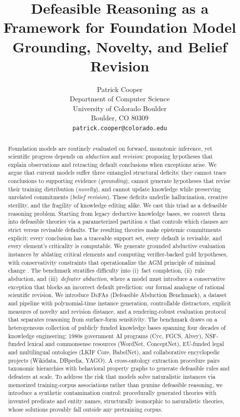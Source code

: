 \documentclass{article}
\title{Defeasible Reasoning as a Framework for Foundation Model Grounding, Novelty, and Belief Revision}
\author{%
  Patrick Cooper \\
  Department of Computer Science\\
  University of Colorado Boulder\\
  Boulder, CO 80309 \\
  \texttt{patrick.cooper@colorado.edu} \\
}
\theoremstyle{definition}
\begin{document}
\maketitle


\begin{abstract}
Foundation models are routinely evaluated on forward, monotonic inference, yet scientific progress depends on \emph{abduction} and \emph{revision}: proposing hypotheses that explain observations and retracting default conclusions when exceptions arise. We argue that current models suffer three entangled structural deficits: they cannot trace conclusions to supporting evidence (\emph{grounding}), cannot generate hypotheses that revise their training distribution (\emph{novelty}), and cannot update knowledge while preserving unrelated commitments (\emph{belief revision}). These deficits underlie hallucination, creative sterility, and the fragility of knowledge editing alike.
We cast this triad as a defeasible reasoning problem. Starting from legacy deductive knowledge bases, we convert them into defeasible theories via a parameterized partition $\kappa$ that controls which clauses are strict versus revisable defaults. The resulting theories make epistemic commitments explicit: every conclusion has a traceable support set, every default is revisable, and every element's criticality is computable. We generate grounded abductive evaluation instances by ablating critical elements and computing verifier-backed gold hypotheses, with conservativity constraints that operationalize the AGM principle of minimal change \cite{alchourron1985logic}. The benchmark stratifies difficulty into (i)~fact completion, (ii)~rule abduction, and (iii)~\emph{defeater abduction}, where a model must introduce a conservative exception that blocks an incorrect default prediction: our formal analogue of rational scientific revision.
We introduce \textsc{DeFAb} (Defeasible Abduction Benchmark), a dataset and pipeline with polynomial-time instance generation, controllable distractors, explicit measures of novelty and revision distance, and a rendering-robust evaluation protocol that separates reasoning from surface-form sensitivity. The benchmark draws on a heterogeneous collection of publicly funded knowledge bases spanning four decades of knowledge engineering: 1980s government AI programs (Cyc, FGCS, Alvey), NSF-funded lexical and commonsense resources (WordNet, ConceptNet), EU-funded legal and multilingual ontologies (LKIF Core, BabelNet), and collaborative encyclopedic projects (Wikidata, DBpedia, YAGO). A cross-ontology extraction procedure pairs taxonomic hierarchies with behavioral property graphs to generate defeasible rules and defeaters at scale. To address the risk that models solve naturalistic instances via memorized training-corpus associations rather than genuine defeasible reasoning, we introduce a synthetic contamination control: procedurally generated theories with invented predicate and entity names, structurally isomorphic to naturalistic theories, whose solutions provably fall outside any pretraining corpus.

\end{abstract}
\end{document}

